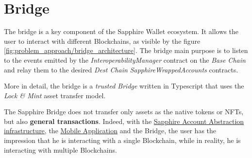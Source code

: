 \section{Bridge}
\label{sec:bridge}

The bridge is a key component of the Sapphire Wallet ecosystem. It allows the user to interact with different Blockchains, as visible by the figure \ref{fig:problem_approach/bridge_architecture}. The bridge main purpose is to listen to the events emitted by the \textit{InteroperabilityManager} contract on the \textit{Base Chain} and relay them to the desired \textit{Dest Chain} \textit{SapphireWrappedAccounts} contracts. 


More in detail, the bridge is a \textit{trusted Bridge} written in Typescript that uses the \textit{Lock \& Mint} asset transfer model. 

The Sapphire Bridge does not transfer only assets as the native tokens or NFTs, but also \textbf{general transactions}. Indeed, with the \hyperref[sec:blockchain]{Sapphire Account Abstraction infrastructure}, the \hyperref[sec:mobile_application]{Mobile Application} and the Bridge, the user has the impression that he is interacting with a single Blockchain, while in reality, he is interacting with multiple Blockchains. 